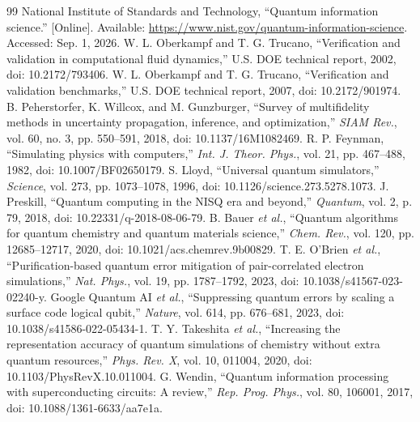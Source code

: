 \documentclass[conference]{../../../../Conference-LaTeX-template_10-17-19/IEEEtran}
\begin{document}
\begin{thebibliography}{99}
 National Institute of Standards and Technology, ``Quantum information science.'' [Online]. Available: \url{https://www.nist.gov/quantum-information-science}. Accessed: Sep. 1, 2026.
 W. L. Oberkampf and T. G. Trucano, ``Verification and validation in computational fluid dynamics,'' U.S. DOE technical report, 2002, doi: 10.2172/793406.
 W. L. Oberkampf and T. G. Trucano, ``Verification and validation benchmarks,'' U.S. DOE technical report, 2007, doi: 10.2172/901974.
 B. Peherstorfer, K. Willcox, and M. Gunzburger, ``Survey of multifidelity methods in uncertainty propagation, inference, and optimization,'' \emph{SIAM Rev.}, vol. 60, no. 3, pp. 550--591, 2018, doi: 10.1137/16M1082469.
 R. P. Feynman, ``Simulating physics with computers,'' \emph{Int. J. Theor. Phys.}, vol. 21, pp. 467--488, 1982, doi: 10.1007/BF02650179.
 S. Lloyd, ``Universal quantum simulators,'' \emph{Science}, vol. 273, pp. 1073--1078, 1996, doi: 10.1126/science.273.5278.1073.
 J. Preskill, ``Quantum computing in the NISQ era and beyond,'' \emph{Quantum}, vol. 2, p. 79, 2018, doi: 10.22331/q-2018-08-06-79.
 B. Bauer \emph{et al.}, ``Quantum algorithms for quantum chemistry and quantum materials science,'' \emph{Chem. Rev.}, vol. 120, pp. 12685--12717, 2020, doi: 10.1021/acs.chemrev.9b00829.
 T. E. O’Brien \emph{et al.}, ``Purification-based quantum error mitigation of pair-correlated electron simulations,'' \emph{Nat. Phys.}, vol. 19, pp. 1787--1792, 2023, doi: 10.1038/s41567-023-02240-y.
 Google Quantum AI \emph{et al.}, ``Suppressing quantum errors by scaling a surface code logical qubit,'' \emph{Nature}, vol. 614, pp. 676--681, 2023, doi: 10.1038/s41586-022-05434-1.
 T. Y. Takeshita \emph{et al.}, ``Increasing the representation accuracy of quantum simulations of chemistry without extra quantum resources,'' \emph{Phys. Rev. X}, vol. 10, 011004, 2020, doi: 10.1103/PhysRevX.10.011004.
 G. Wendin, ``Quantum information processing with superconducting circuits: A review,'' \emph{Rep. Prog. Phys.}, vol. 80, 106001, 2017, doi: 10.1088/1361-6633/aa7e1a.
\end{thebibliography}
\end{document}
